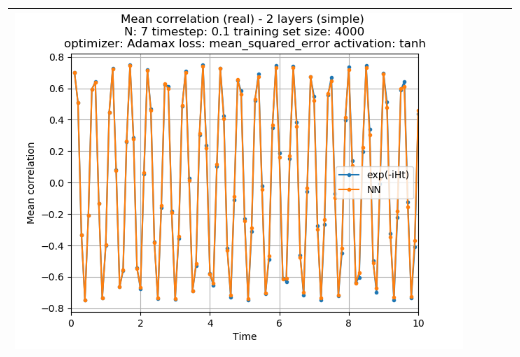 \documentclass{article}
\begin{document}
\begin{tabular}{|c|c|c|c|}
     \includegraphics[scale=0.37]{./Searching_for_good_train_set_size/2_layers_simple_train_samples=4000_timestep=0.1_t_total=10.0_optimizer=Adamax_loss=mean_squared_error_activation=tanh/Corr_N=7_(real).png} \\ \hline


\end{tabular}
\end{document}
